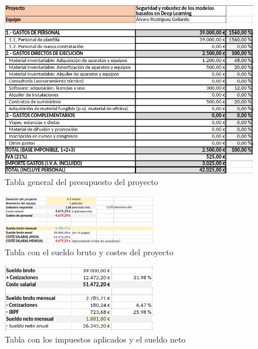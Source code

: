 \begin{figure}[h]
    \centering
        \centering
        \includegraphics[width=\textwidth]{img/Presupuesto.png}
        \caption{Tabla general del presupuesto del proyecto}
        \label{fig:presupuesto}
\end{figure}

\begin{figure}[h]
    \centering
        \centering
        \includegraphics[width=0.6\textwidth]{img/Personal_1.png}
        \caption{Tabla con el sueldo bruto y costes del proyecto}
        \label{fig:pers1}
\end{figure}

\begin{figure}[h]
    \centering
        \centering
        \includegraphics[width=0.6\textwidth]{img/Personal_2.png}
        \caption{Tabla con los impuestos aplicados y el sueldo neto}
        \label{fig:pers2}
\end{figure}

